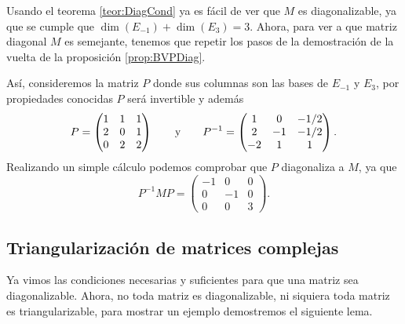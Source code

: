\begin{example}
  Usando el teorema \ref{teor:DiagCond} ya es fácil de ver que $M$ es diagonalizable, ya que se cumple que $\dim(E_{-1}) + \dim(E_{3}) = 3$. Ahora, para ver a que matriz diagonal $M$  es semejante, tenemos que repetir los pasos de la demostración de la vuelta de la proposición \ref{prop:BVPDiag}.

  Así, consideremos la matriz $P$ donde sus columnas son las bases de $E_{-1}$ y $E_{3}$, por propiedades conocidas $P$ será invertible y además
    \[
      P = \begin{pmatrix}
        1 & 1 & 1 \\
        2 & 0 & 1 \\
        0 & 2 & 2
      \end{pmatrix}
        \qquad\text{y}\qquad
      P^{-1} = \begin{pmatrix} 1 & 0 & -1/2 \\ 2 & -1 & - 1/2 \\ -2 & 1 & 1 \end{pmatrix}.
    \]
  Realizando un simple cálculo podemos comprobar que $P$ diagonaliza a $M$, ya que
    \[
      P^{-1}MP = \begin{pmatrix} -1 & 0 & 0 \\ 0 & -1 & 0 \\ 0 & 0 & 3 \end{pmatrix}.
    \]
\end{example}

\subsection{Triangularización de matrices complejas}

Ya vimos las condiciones necesarias y suficientes para que una matriz sea diagonalizable. Ahora, no toda matriz es diagonalizable, ni siquiera toda matriz es triangularizable, para mostrar un ejemplo demostremos el siguiente lema.

